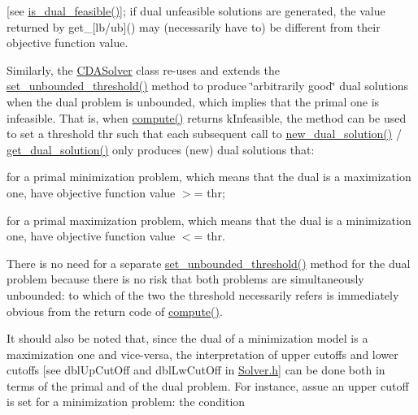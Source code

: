 \begin{DoxyItemize}
\mbox{[}see \mbox{\hyperlink{class_s_m_spp__di__unipi__it_1_1_c_d_a_solver_a974e986ce1a04d44660bb5c573e8315d}{is\+\_\+dual\+\_\+feasible()}}\mbox{]}; if dual unfeasible solutions are generated, the value returned by get\+\_\+\mbox{[}lb/ub\mbox{]}() may (necessarily have to) be different from their objective function value.
\end{DoxyItemize}

Similarly, the \mbox{\hyperlink{class_s_m_spp__di__unipi__it_1_1_c_d_a_solver}{C\+D\+A\+Solver}} class re-\/uses and extends the \mbox{\hyperlink{class_s_m_spp__di__unipi__it_1_1_solver_ae1717d1363782e086aa797e7437c0352}{set\+\_\+unbounded\+\_\+threshold()}} method to produce \char`\"{}arbitrarily good\char`\"{} dual solutions when the dual problem is unbounded, which implies that the primal one is infeasible. That is, when \mbox{\hyperlink{class_s_m_spp__di__unipi__it_1_1_solver_a504d4e3e174c7a518cc66156a8a45ce5}{compute()}} returns k\+Infeasible, the method can be used to set a threshold thr such that each subsequent call to \mbox{\hyperlink{class_s_m_spp__di__unipi__it_1_1_c_d_a_solver_a8c650415b6673c33692c363abdfdef00}{new\+\_\+dual\+\_\+solution()}} / \mbox{\hyperlink{class_s_m_spp__di__unipi__it_1_1_c_d_a_solver_a347d37171494bf83416a48b279b94d5a}{get\+\_\+dual\+\_\+solution()}} only produces (new) dual solutions that\+:


\begin{DoxyItemize}
\item for a primal minimization problem, which means that the dual is a maximization one, have objective function value $>$= thr;
\item for a primal maximization problem, which means that the dual is a minimization one, have objective function value $<$= thr.
\end{DoxyItemize}

There is no need for a separate \mbox{\hyperlink{class_s_m_spp__di__unipi__it_1_1_solver_ae1717d1363782e086aa797e7437c0352}{set\+\_\+unbounded\+\_\+threshold()}} method for the dual problem because there is no risk that both problems are simultaneously unbounded\+: to which of the two the threshold necessarily refers is immediately obvious from the return code of \mbox{\hyperlink{class_s_m_spp__di__unipi__it_1_1_solver_a504d4e3e174c7a518cc66156a8a45ce5}{compute()}}.

It should also be noted that, since the dual of a minimization model is a maximization one and vice-\/versa, the interpretation of upper cutoffs and lower cutoffs \mbox{[}see dbl\+Up\+Cut\+Off and dbl\+Lw\+Cut\+Off in \mbox{\hyperlink{_solver_8h}{Solver.\+h}}\mbox{]} can be done both in terms of the primal and of the dual problem. For instance, assue an upper cutoff  is set for a minimization problem\+: the condition


